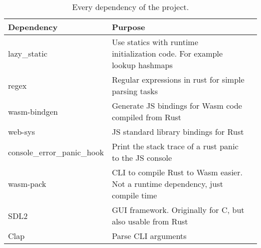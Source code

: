 \begin{table}[h]
  \begin{center}
    \centering
    \begin{tabularx}{\textwidth}{|l|X|X|}
      \toprule
      Dependency        & Purpose              \\ \midrule
      lazy\_static      & Use statics with runtime initialization code. For example lookup hashmaps \\ \midrule
      regex      & Regular expressions in rust for simple parsing tasks \\ \midrule
      wasm-bindgen      & Generate JS bindings for Wasm code compiled from Rust \\ \midrule
      web-sys      & JS standard library bindings for Rust \\ \midrule
      console\_error\_panic\_hook      & Print the stack trace of a rust panic to the JS console \\ \midrule
      wasm-pack      & CLI to compile Rust to Wasm easier. Not a runtime dependency, just compile time \\ \midrule
      SDL2      & GUI framework. Originally for C, but also usable from Rust \\ \midrule
      Clap      & Parse CLI arguments \\
      \bottomrule
    \end{tabularx}
    \caption{Every dependency of the project.}
    \label{table:dependencies}
  \end{center}
\end{table}





